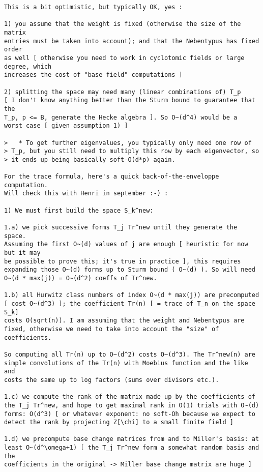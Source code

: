 \documentclass[11pt]{amsart}
\numberwithin{equation}{subsection}
\theoremstyle{definition}
\begin{document}
\begin{verbatim}
This is a bit optimistic, but typically OK, yes :

1) you assume that the weight is fixed (otherwise the size of the matrix
entries must be taken into account); and that the Nebentypus has fixed order
as well [ otherwise you need to work in cyclotomic fields or large degree, which
increases the cost of "base field" computations ]

2) splitting the space may need many (linear combinations of) T_p 
[ I don't know anything better than the Sturm bound to guarantee that the
T_p, p <= B, generate the Hecke algebra ]. So O~(d^4) would be a
worst case [ given assumption 1) ]

>   * To get further eigenvalues, you typically only need one row of
> T_p, but you still need to multiply this row by each eigenvector, so
> it ends up being basically soft-O(d*p) again.

For the trace formula, here's a quick back-of-the-enveloppe computation.
Will check this with Henri in september :-) :

1) We must first build the space S_k^new: 

1.a) we pick successive forms T_j Tr^new until they generate the space.
Assuming the first O~(d) values of j are enough [ heuristic for now but it may
be possible to prove this; it's true in practice ], this requires
expanding those O~(d) forms up to Sturm bound ( O~(d) ). So will need
O~(d * max(j)) = O~(d^2) coeffs of Tr^new.

1.b) all Hurwitz class numbers of index O~(d * max(j)) are precomputed
[ cost O~(d^3) ]; the coefficient Tr(n) [ = trace of T_n on the space S_k]
costs O(sqrt(n)). I am assuming that the weight and Nebentypus are
fixed, otherwise we need to take into account the "size" of coefficients.

So computing all Tr(n) up to O~(d^2) costs O~(d^3). The Tr^new(n) are
simple convolutions of the Tr(n) with Moebius function and the like and
costs the same up to log factors (sums over divisors etc.).

1.c) we compute the rank of the matrix made up by the coefficients of
the T_j Tr^new, and hope to get maximal rank in O(1) trials with O~(d)
forms: O(d^3) [ or whatever exponent: no soft-Oh because we expect to
detect the rank by projecting Z[\chi] to a small finite field ]

1.d) we precompute base change matrices from and to Miller's basis: at
least O~(d^\omega+1) [ the T_j Tr^new form a somewhat random basis and the
coefficients in the original -> Miller base change matrix are huge ]


\end{verbatim}
\end{document}
